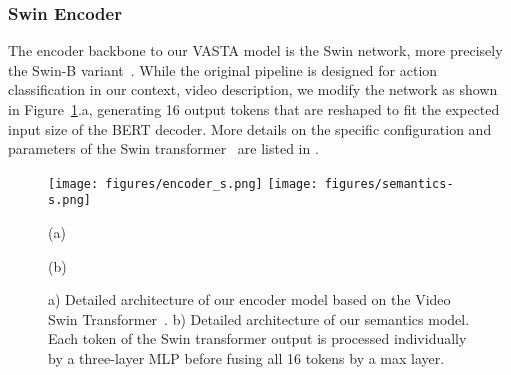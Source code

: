 \documentclass[runningheads,table]{llncs}
\newcommand{\modelName}{VASTA\xspace}
\begin{document}
\begin{table*}
    \caption{Train, validation and test splits of the utilized data sets. 
    }\label{tab:dataset-splits}
\end{table*}

\subsubsection{Swin Encoder}
The encoder backbone to our \modelName{} model is the Swin network, more precisely the Swin-B variant~\cite{liu2021swin}. While the original pipeline is designed for action classification in our context, video description, we modify the network as shown in Figure~\ref{fig:encoder}.a, generating 16 output tokens that are reshaped to fit the expected input size of the BERT decoder.
More details on the specific configuration and parameters of the Swin transformer~\cite{liu2021swin} are listed in .


\begin{figure}
    \centering
    {
        \hfill \texttt{[image: figures/encoder\_s.png]} \hfill
        \hfill  \texttt{[image: figures/semantics-s.png]} \hfill
        \\
        \parbox{0.48\linewidth}{\centering
        \small{(a)}
        }
        \parbox{0.48\linewidth}{\centering
        \small{(b)}
        }
    }
    
    \caption{a) Detailed architecture of our encoder model based on the Video Swin Transformer~\cite{liu2021video}. b) Detailed architecture of our semantics model. Each token of the Swin transformer output is processed individually by a three-layer MLP before fusing all 16 tokens by a max layer.}\label{fig:encoder}
\end{figure}
\end{document}
